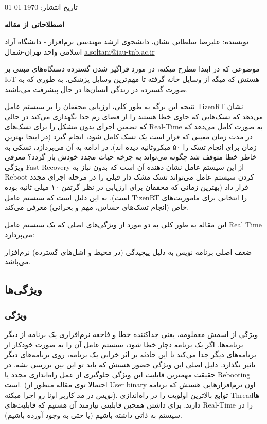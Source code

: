 \documentclass[10pt, a4paper]{article}
\begin{document}
تاریخ انتشار: \today

\textbf{اصطلاحاتی از مقاله }

نویسنده: علیرضا سلطانی نشان، دانشجوی ارشد مهندسی نرم‌افزار - دانشگاه آزاد اسلامی
واحد تهران-شمال \href{mailto:a.soltani@iau-tnb.ac.ir}{a.soltani@iau-tnb.ac.ir}



موضوعی که در ابتدا مطرح میکنه، در مورد فراگیر شدن گسترده دستگاه‌های مبتنی بر IoT
هستش که میگه از وسایل خانه گرفته تا مهم‌ترین وسایل پزشکی. به طوری که به صورت
گسترده در زندگی انسان‌ها در حال پیشرفت می‌باشند. 

نتیجه این برگه به طور کلی، ارزیابی محققان را بر سیستم عامل TizenRT نشان می‌دهد
که تسک‌هایی که حاوی خطا هستند را از فضای رم جدا نگهداری می‌کند در حالی که تضمین
اجرای بدون مشکل را برای تسک‌های Real-Time به صورت کامل می‌دهد که در مدت زمان
معینی که قرار است یک تسک کامل شود، انجام گیرد (در اینجا بهترین زمان برای انجام
تسک را ۵۰ میکروثانیه دیده اند). در ادامه به آن می‌پردازد، تسکی به خاطر خطا متوقف
شد چگونه می‌تواند به چرخه حیات مجدد خودش باز گردد؟ معرفی ویژگی Fast Recovery از
این سیستم عامل نشان دهنده آن است که بدون نیاز به Reboot کردن سیستم عامل می‌تواند
تسک مشک دار قبلی را در مرحله اجرای مجدد قرار داد (بهترین زمانی که محققان برای
ارزیابی در نظر گرتفن ۱۰ میلی ثانیه بوده است). به این دلیل است که سیستم عامل
TizenRT را انتخابی برای ماموریت‌های خاص (انجام تسک‌های حساس، مهم و بحرانی) معرفی
می‌کند.

این مقاله به طور کلی به دو مورد از ویژگی‌های اصلی که یک سیستم عامل Real Time
می‌پردازد:

ضعف اصلی برنامه نویس به دلیل پیچیدگی (در محیط و اشل‌های گسترده) نرم‌افزار می‌باشد.

\subsection{ویژگی‌ها}

\subsubsection{ویژگی }

ویژگی  از اسمش معملومه، یعنی جداکننده خطا و فاجعه نرم‌افزاری
یک برنامه از دیگر برنامه‌ها. اگر یک برنامه دچار خطا شود، سیستم‌ عامل آن را به
صورت خودکار از برنامه‌های دیگر جدا می‌کند تا این حادثه بر اثر خرابی یک برنامه،
روی برنامه‌های دیگر تاثیر نگذارد. دلیل اصلی این ویژگی حضور  هستش که باید تو این بین بررسی بشه. در حقیقت مهمترین قابلیت این ویژگی
جلوگیری از عمل راه‌اندازی مجدد یا Rebooting است. (احتمالا توی مقاله منظور از
User binary اون نرم‌افزارهایی هستش که برنامه نویس در مد کاربر اونا رو اجرا
میکنه). توابع  بالاترین اولویت را  در راه‌اندازی Thread‌ها
دارند.  برای داشتن همچین قابلیتی نیازمند آن هستیم که قابلیت‌های Real-Time را در
سیستم به ذاتی داشته باشیم (یا حتی به وجود آورده باشیم).
\end{document}
